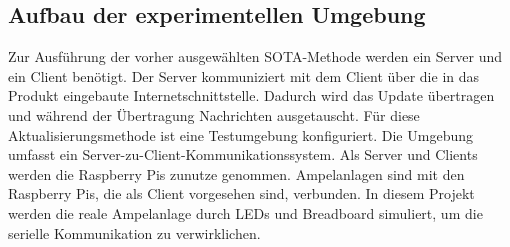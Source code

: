 \subsection{Aufbau der experimentellen Umgebung}

Zur Ausführung der vorher ausgewählten SOTA-Methode werden ein Server und ein Client benötigt. Der Server kommuniziert mit dem Client über die in das Produkt eingebaute Internetschnittstelle. Dadurch wird das Update übertragen und während der Übertragung Nachrichten ausgetauscht. Für diese Aktualisierungsmethode ist eine Testumgebung konfiguriert. Die Umgebung umfasst ein Server-zu-Client-Kommunikationssystem. Als Server und Clients werden die Raspberry Pis  zunutze genommen. Ampelanlagen sind mit den Raspberry Pis, die als Client vorgesehen sind, verbunden. In diesem Projekt werden die reale Ampelanlage durch LEDs und Breadboard simuliert, um die serielle Kommunikation zu verwirklichen.
